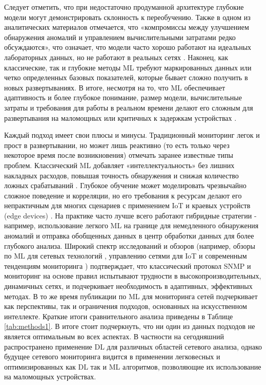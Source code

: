 Следует отметить, что при недостаточно продуманной архитектуре глубокие модели могут демонстрировать склонность к переобучению.
Также в одном из аналитических материалов отмечается, что «компромиссы между улучшением обнаружения аномалий и управлением вычислительными затратами редко обсуждаются», что означает, что модели часто хорошо работают на идеальных лабораторных данных, но не работают в реальных сетях \cite{Jebur2025}. Наконец, как классические, так и глубокие методы ML требуют маркированных данных или четко определенных базовых показателей, которые бывает сложно получить в новых развертываниях. В итоге, несмотря на то, что ML обеспечивает адаптивность и более глубокое понимание, размер модели, вычислительные затраты и требования для работы в реальном времени делают его сложным для развертывания на маломощных или критичных к задержкам устройствах \cite{Jebur2025}.


Каждый подход имеет свои плюсы и минусы. Традиционный мониторинг легок и прост в развертывании, но может лишь реактивно (то есть только через некоторое время после возникновения) отмечать заранее известные типы проблем. Классический ML добавляет «интеллектуальность» без лишних накладных расходов, повышая точность обнаружения и снижая количество ложных срабатываний \cite{Mirza2012}. Глубокое обучение может моделировать чрезвычайно сложное поведение и корреляции, но его требования к ресурсам делают его непрактичным для многих сценариев с применением IoT и краевых устройств (edge devices) \cite{Jebur2025}. На практике часто лучше всего работают гибридные стратегии - например, использование легкого ML на границе для немедленного обнаружения аномалий и отправка обобщенных данных в центр обработки данных для более глубокого анализа. Широкий спектр исследований и обзоров (например, обзоры по ML для сетевых технологий \cite{Abbasi2021, Mirza2012}, управлению сетями для IoT \cite{Aboubakar2022, GRAF2024989} и современным тенденциям мониторинга \cite{snmp1, mlmon1}) подтверждает, что классический протокол SNMP и мониторинг на основе правил испытывают трудности в высокопроизводительных, динамичных сетях, и подчеркивает необходимость в адаптивных, эффективных методах. В то же время публикации по ML для мониторинга сетей \cite{Mirza2012, Jebur2025} подчеркивает как перспективы, так и ограничения подходов, основанных на искусственном интеллекте. Краткие итоги сравнительного анализа приведены в Таблице \ref{tab:methods1}. В итоге стоит подчеркнуть, что ни один из данных подходов не является оптимальным во всех аспектах. В частности на сегодняшний распространено применение DL для различных областей сетевого анализа, однако будущее сетевого мониторинга видится в применении легковесных и  оптимизированных как DL так и ML алгоритмов, позволяющие их использование на маломощных устройствах.

